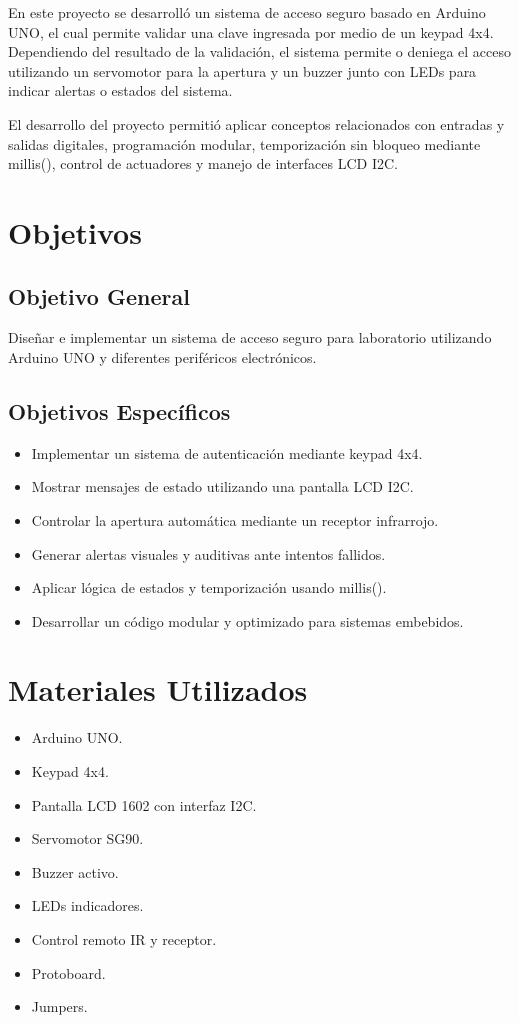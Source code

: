 \documentclass[conference]{IEEEtran}
\begin{document}
En este proyecto se desarrolló un sistema de acceso seguro basado en Arduino UNO, el cual permite 
validar una clave ingresada por medio de un keypad 4x4. Dependiendo del resultado de la validación, 
el sistema permite o deniega el acceso utilizando un servomotor para la apertura y un buzzer junto 
con LEDs para indicar alertas o estados del sistema.

El desarrollo del proyecto permitió aplicar conceptos relacionados con entradas y salidas digitales, 
programación modular, temporización sin bloqueo mediante millis(), control de actuadores y manejo de 
interfaces LCD I2C.

\section{Objetivos}

\subsection{Objetivo General}

Diseñar e implementar un sistema de acceso seguro para laboratorio utilizando Arduino UNO y diferentes 
periféricos electrónicos.

\subsection{Objetivos Específicos}

\begin{itemize}
    \item Implementar un sistema de autenticación mediante keypad 4x4.
    \item Mostrar mensajes de estado utilizando una pantalla LCD I2C.
    \item Controlar la apertura automática mediante un receptor infrarrojo.
    \item Generar alertas visuales y auditivas ante intentos fallidos.
    \item Aplicar lógica de estados y temporización usando millis().
    \item Desarrollar un código modular y optimizado para sistemas embebidos.
\end{itemize}

\section{Materiales Utilizados}

\begin{itemize}
    \item Arduino UNO.
    \item Keypad 4x4.
    \item Pantalla LCD 1602 con interfaz I2C.
    \item Servomotor SG90.
    \item Buzzer activo.
    \item LEDs indicadores.
    \item Control remoto IR y receptor.
    \item Protoboard.
    \item Jumpers.
\end{itemize}
\end{document}
